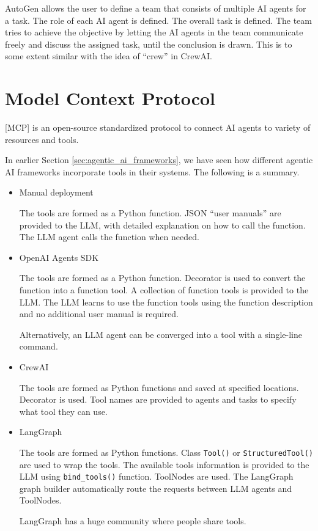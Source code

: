 AutoGen allows the user to define a team that consists of multiple AI agents for a task. The role of each AI agent is defined. The overall task is defined. The team tries to achieve the objective by letting the AI agents in the team communicate freely and discuss the assigned task, until the conclusion is drawn. This is to some extent similar with the idea of ``crew'' in CrewAI. 

\section{Model Context Protocol} \label{sec:mcp}

[MCP] is an open-source standardized protocol to connect AI agents to variety of resources and tools.

In earlier Section \ref{sec:agentic_ai_frameworks}, we have seen how different agentic AI frameworks incorporate tools in their systems. The following is a summary.
\begin{itemize}
	\item Manual deployment
	
	The tools are formed as a Python function. JSON ``user manuals'' are provided to the LLM, with detailed explanation on how to call the function. The LLM agent calls the function when needed.
	
	\item OpenAI Agents SDK
	
	The tools are formed as a Python function. Decorator is used to convert the function into a function tool. A collection of function tools is provided to the LLM. The LLM learns to use the function tools using the function description and no additional user manual is required.
	
	Alternatively, an LLM agent can be converged into a tool with a single-line command.
	
	\item CrewAI
	
	The tools are formed as Python functions and saved at specified locations. Decorator is used. Tool names are provided to agents and tasks to specify what tool they can use.
	
	\item LangGraph
	
	The tools are formed as Python functions. Class \verb|Tool()| or \verb|StructuredTool()| are used to wrap the tools. The available tools information is provided to the LLM using \verb|bind_tools()| function. ToolNodes are used. The LangGraph graph builder automatically route the requests between LLM agents and ToolNodes.
	
	LangGraph has a huge community where people share tools.
\end{itemize}

